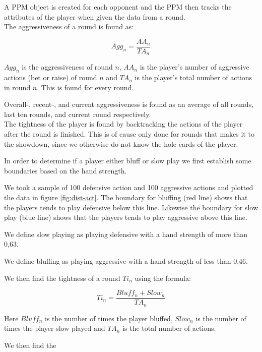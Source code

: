 A PPM object is created for each opponent and the PPM then tracks the attributes of the player when given the data from a round.\\

The aggressiveness of a round is found as:

\[Agg_{n} = \frac{AA_{n}}{TA_{n}}\]

$Agg_{n}$ is the aggressiveness of round $n$, $AA_{n}$ is the player's number of aggressive actions (bet or raise) of round $n$ and  $TA_{n}$ is the player's total number of actions in round $n$. This is found for every round. 

Overall-, recent-, and current aggressiveness is found as an average of all rounds, last ten rounds, and current round respectively.\\

The tightness of the player is found by backtracking the actions of the player after the round is finished. This is of cause only done for rounds that makes it to the showdown, since we otherwise do not know the hole cards of the player.

In order to determine if a player either bluff or slow play we first establish some boundaries based on the hand strength. 

We took a sample of 100 defensive action and 100 aggressive actions and plotted the data in figure \ref{fig:dist-act}. The boundary for bluffing (red line) shows that the players tends to play defensive below this line. Likewise the boundary for slow play (blue line) shows that the players tends to play aggressive above this line.

We define slow playing as playing defensive with a hand strength of more than 0,63.

We define bluffing as playing aggressive with a hand strength of less than 0,46.

We then find the tightness of a round $Ti_{n}$ using the formula:

\[Ti_{n} = \frac{Bluff_{n} + Slow_{n}}{TA_{n}}\]

Here $Bluff_{n}$ is the number of times the player bluffed, $Slow_{n}$ is the number of times the player slow played and $TA_{n}$ is the total number of actions.

We then find the 

